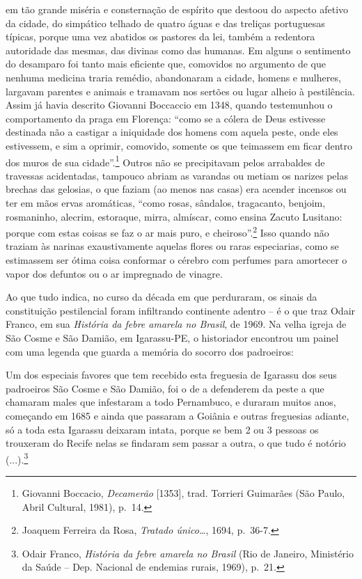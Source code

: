 em tão grande miséria e consternação de espírito que destoou do aspecto
afetivo da cidade, do simpático telhado de quatro águas e das treliças
portuguesas típicas, porque uma vez abatidos os pastores da lei, também
a redentora autoridade das mesmas, das divinas como das humanas. Em
alguns o sentimento do desamparo foi tanto mais eficiente que, comovidos
no argumento de que nenhuma medicina traria remédio, abandonaram a
cidade, homens e mulheres, largavam parentes e animais e tramavam nos
sertões ou lugar alheio à pestilência. Assim já havia descrito Giovanni
Boccaccio em 1348, quando testemunhou o comportamento da praga em
Florença: ``como se a cólera de Deus estivesse destinada não a castigar
a iniquidade dos homens com aquela peste, onde eles estivessem, e sim a
oprimir, comovido, somente os que teimassem em ficar dentro dos muros de
sua cidade''.\footnote{Giovanni Boccacio, \emph{Decamerão} {[}1353{]},
  trad. Torrieri Guimarães (São Paulo, Abril Cultural, 1981), p.~14.}
Outros não se precipitavam pelos arrabaldes de travessas acidentadas,
tampouco abriam as varandas ou metiam os narizes pelas brechas das
gelosias, o que faziam (ao menos nas casas) era acender incensos ou ter
em mãos ervas aromáticas, ``como rosas, sândalos, tragacanto, benjoim,
rosmaninho, alecrim, estoraque, mirra, almíscar, como ensina Zacuto
Lusitano: porque com estas coisas se faz o ar mais puro, e
cheiroso''.\footnote{Joaquem Ferreira da Rosa, \emph{Tratado
  único\ldots{}}, 1694, p.~36-7.} Isso quando não traziam às narinas
exaustivamente aquelas flores ou raras especiarias, como se estimassem
ser ótima coisa conformar o cérebro com perfumes para amortecer o vapor
dos defuntos ou o ar impregnado de vinagre.

Ao que tudo indica, no curso da década em que perduraram, os sinais da
constituição pestilencial foram infiltrando continente adentro -- é o
que traz Odair Franco, em sua \emph{História da febre amarela no
Brasil}, de 1969. Na velha igreja de São Cosme e São Damião, em
Igarassu-PE, o historiador encontrou um painel com uma legenda que
guarda a memória do socorro dos padroeiros:

Um dos especiais favores que tem recebido esta freguesia de Igarassu dos
seus padroeiros São Cosme e São Damião, foi o de a defenderem da peste a
que chamaram males que infestaram a todo Pernambuco, e duraram muitos
anos, começando em 1685 e ainda que passaram a Goiânia e outras
freguesias adiante, só a toda esta Igarassu deixaram intata, porque se
bem 2 ou 3 pessoas os trouxeram do Recife nelas se findaram sem passar a
outra, o que tudo é notório (...).\footnote{Odair Franco, \emph{História
  da febre amarela no Brasil} (Rio de Janeiro, Ministério da Saúde --
  Dep. Nacional de endemias rurais, 1969), p.~21.}

